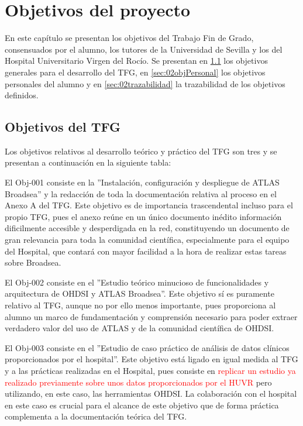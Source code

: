 \chapter{Objetivos del proyecto}\label{cap:02objetivos}

En este capítulo se presentan los objetivos del Trabajo Fin de Grado, consensuados por el alumno, los tutores de la Universidad de Sevilla y los del Hospital Universitario Virgen del Rocío. Se presentan en \ref{sec:02objTFG} los objetivos generales para el desarrollo del TFG, en \ref{sec:02objPersonal} los objetivos personales del alumno y en \ref{sec:02trazabilidad} la trazabilidad de los objetivos definidos.

\section{Objetivos del TFG} \label{sec:02objTFG}

Los objetivos relativos al desarrollo teórico y práctico del TFG son tres y se presentan a continuación en la siguiente tabla:



El Obj-001 consiste en la ''Instalación, configuración y despliegue de ATLAS Broadsea'' y la redacción de toda la documentación relativa al proceso en el Anexo A del TFG. Este objetivo es de importancia trascendental incluso para el propio TFG, pues el anexo reúne en un único documento inédito información dificilmente accesible y desperdigada en la red, constituyendo un documento de gran relevancia para toda la comunidad científica, especialmente para el equipo del Hospital, que contará con mayor facilidad a la hora de realizar estas tareas sobre Broadsea.

El Obj-002 consiste en el ''Estudio teórico minucioso de funcionalidades y arquitectura de OHDSI y ATLAS Broadsea''. Este objetivo sí es puramente relativo al TFG, aunque no por ello menos importante, pues proporciona al alumno un marco de fundamentación y comprensión necesario para poder extraer verdadero valor del uso de ATLAS y de la comunidad científica de OHDSI.

El Obj-003 consiste en el ''Estudio de caso práctico de análisis de datos clínicos proporcionados por el hospital''. Este objetivo está ligado en igual medida al TFG y a las prácticas realizadas en el Hospital, pues consiste en \textcolor{red}{replicar un estudio ya realizado previamente sobre unos datos proporcionados por el HUVR} pero utilizando, en este caso, las herramientas OHDSI. La colaboración con el hospital en este caso es crucial para el alcance de este objetivo que de forma práctica complementa a la documentación teórica del TFG.


